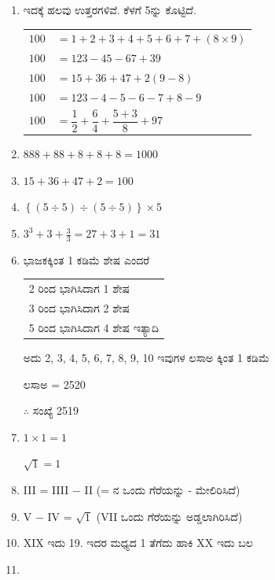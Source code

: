 \begin{enumerate}
\itemsep=5pt
\item ಇದಕ್ಕೆ ಹಲವು ಉತ್ತರಗಳಿವೆ. ಕೆಳಗೆ 5ನ್ನು ಕೊಟ್ಟಿದೆ.

\begin{tabular}{ll}
$100$ & $= 1 + 2 + 3 + 4 + 5 + 6 + 7 + (8 \times 9)$\\[0.1cm]
$100$ & $= 123 - 45 - 67 + 39$\\[0.1cm]
$100$ & $= 15 + 36 + 47 + 2 (9 - 8)$\\[0.1cm]
$100$ & $= 123 - 4 - 5 - 6 - 7 + 8 - 9$\\ [0.1cm]
$100$ & $= \dfrac{1}{2} + \dfrac{6}{4} + \dfrac{5 + 3}{8} + 97$
\end{tabular}

\smallskip
\item $888 + 88 + 8 + 8 + 8 = 1000$

\item $15 + 36 + 47 + 2 = 100$

\item $\left\{(5 \div 5) \div (5 \div 5)\right\} \times 5$

\item $3^{3} + 3 + \frac{3}{3} = 27 + 3 + 1 = 31$

\item ಭಾಜಕಕ್ಕಿಂತ 1 ಕಡಿಮೆ ಶೇಷ ಎಂದರೆ 

\begin{tabular}{l}
2 ರಿಂದ ಭಾಗಿಸಿದಾಗ 1 ಶೇಷ\\
3 ರಿಂದ ಭಾಗಿಸಿದಾಗ 2 ಶೇಷ\\
5 ರಿಂದ ಭಾಗಿಸಿದಾಗ 4 ಶೇಷ ಇತ್ಯಾದಿ
\end{tabular}

\smallskip
ಅದು 2, 3, 4, 5, 6, 7, 8, 9, 10 ಇವುಗಳ ಲಸಾಅ ಕ್ಕಿಂತ 1 ಕಡಿಮೆ 

\quad ಲಸಾಅ = 2520

$\therefore$ ಸಂಖ್ಯೆ  2519

\item $1 \times 1 = 1$

$\sqrt{1} = 1$

\item III = IIII $-$ II (= ನ ಒಂದು ಗೆರೆಯನ್ನು - ಮೇಲಿರಿಸಿದೆ)

\item V $-$ IV = $\sqrt{1}$ (VII ಒಂದು ಗೆರೆಯನ್ನು ಅಡ್ಡಲಾಗಿರಿಸಿದೆ)

\item XIX ಇದು 19. ಇದರ ಮಧ್ಯದ 1 ತೆಗೆದು ಹಾಕಿ XX ಇದು ಬಲ  

\item 
~


\end{enumerate}
